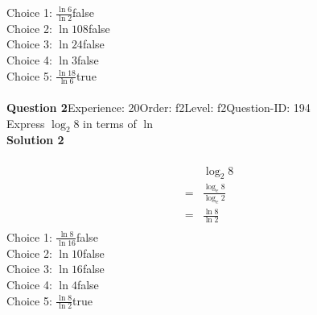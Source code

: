 \documentclass{article}
\begin{document}
Choice 1: \hspace{20pt}$\displaystyle\frac{\ln6}{\ln2}$\hspace{20pt}false\\
Choice 2: \hspace{20pt}$\ln{108}$\hspace{20pt}false\\
Choice 3: \hspace{20pt}$\ln{24}$\hspace{20pt}false\\
Choice 4: \hspace{20pt}$\ln{3}$\hspace{20pt}false\\
Choice 5: \hspace{20pt}$\displaystyle\frac{\ln18}{\ln6}$\hspace{20pt}true\\
\\[4pt]
\noindent\textbf{Question 2}\hspace{20pt}Experience: 20\hspace{20pt}Order: f2\hspace{20pt}Level: f2\hspace{20pt}Question-ID: 194\\[2pt]
Express $\log_{2}8$ in terms of $\ln$\\[4pt]
\noindent\textbf{Solution 2}\\[2pt]
\\[-35pt]\begin{align*}
&\log_{2}8\\[2pt]
=&\displaystyle\frac{\log_{e}8}{\log_{e}2}\\[2pt]
=&\displaystyle\frac{\ln8}{\ln2}\\[-100pt]
\end{align*}
Choice 1: \hspace{20pt}$\displaystyle\frac{\ln8}{\ln16}$\hspace{20pt}false\\
Choice 2: \hspace{20pt}$\ln{10}$\hspace{20pt}false\\
Choice 3: \hspace{20pt}$\ln{16}$\hspace{20pt}false\\
Choice 4: \hspace{20pt}$\ln{4}$\hspace{20pt}false\\
Choice 5: \hspace{20pt}$\displaystyle\frac{\ln8}{\ln2}$\hspace{20pt}true\\
\end{document}
